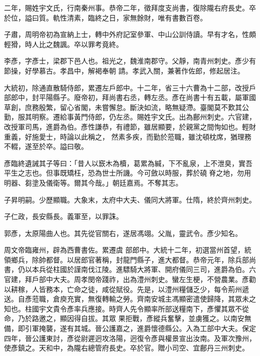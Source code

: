\begin{pinyinscope}
 二年，賜姓宇文氏，行南秦州事。恭帝二年，徵拜度支尚書，復除隴右府長史。卒於位，謚曰質。軌性清素，臨終之日，家無餘財，唯有書數百卷。



 子肅，周明帝初為宣納上士，轉中外府記室參軍、中山公訓侍讀。早有才名，性頗輕猾，時人比之魏諷。卒以罪考竟終。



 李彥，字彥士，梁郡下邑人也。祖光之，魏淮南郡守。父靜，南青州刺史。彥少有節操，好學慕古。孝昌中，解褐奉朝
 請。孝武入關，兼著作佐郎，修起居注。



 大統初，除通直散騎侍郎，累遷左戶郎中。十二年，省三十六曹為十二部，改授戶部郎中，封平陽縣子。廢帝初，拜尚書右丞，轉左丞。彥在尚書十有五載，屬軍國草創，庶務殷繁，留心省閣，未嘗懈怠。斷決如流，略無疑滯。臺閣莫不歎其公勤，服其明察。遷給事黃門侍郎，仍左丞。賜姓宇文氏。出為鄜州刺史。六官建，改授軍司馬，進爵為伯。彥性謙恭，有禮節，雖居顯要，於親黨之間恂如也。輕財重義，好施愛士，時論以此稱之，
 然素多疾，而勤於蒞職，雖沈頓枕席，猶理務不輟，遂至於卒。謚曰敬。



 彥臨終遺誡其子等曰：「昔人以窾木為櫝，葛累為緘，下不亂泉，上不泄臭，實吾平生之志也。但事既矯枉，恐為世士所譏。今可斂以時服，葬於磽脊之地，勿用明器、芻塗及儀衛等。爾其今哉。」朝廷嘉焉。不奪其志。



 子昇明嗣。少歷顯職。大象末，太府中大夫、儀同大將軍。仕隋，終於齊州刺史。



 子仁政，長安縣長。義軍至，以罪誅。



 郭彥，太原陽曲人也。其先從官關右，遂居馮翊。父胤，靈武令。彥少知名。



 周文帝臨雍州，辟為西曹書佐。累遷虞
 部郎中。大統十二年，初選當州首望，統領鄉兵，除帥都督。以居郎官著稱，封龍門縣子，進大都督。恭帝元年，除兵部尚書，仍以本兵從柱國於謹南伐江陵。進驃騎大將軍、開府儀同三司，進爵為伯。六官建，拜戶部中大夫。周孝閔帝踐祚，出為澧州刺史。蠻左生梗，不營農業。彥勸以耕稼，人皆務本，亡命之徒，咸從賦役。先是，以澧州糧儲乏少，每令荊州遞送。自彥蒞職，倉庾充實，無復轉輸之勞。齊南安城主馮顯密遣使歸降，其眾未之知也。柱國宇文貴令彥率兵應接。時齊人先令顯率所部送糧南下，彥懼其眾不從命，乃於路邀之，顯因得自拔。其眾
 果拒戰，彥縱兵奮擊，並虜獲之。以南安無備，即引軍掩襲，遂有其城。晉公護嘉之，進爵懷德縣公。入為工部中大夫。保定四年，晉公護東討，彥從尉遲迥攻洛陽，迥復令彥與權景宣出汝南。及軍次豫州，使彥鎮之。天和中，為隴右總管府長史。卒於官。贈小司空、宜鄜丹三州刺史。




\end{pinyinscope}
